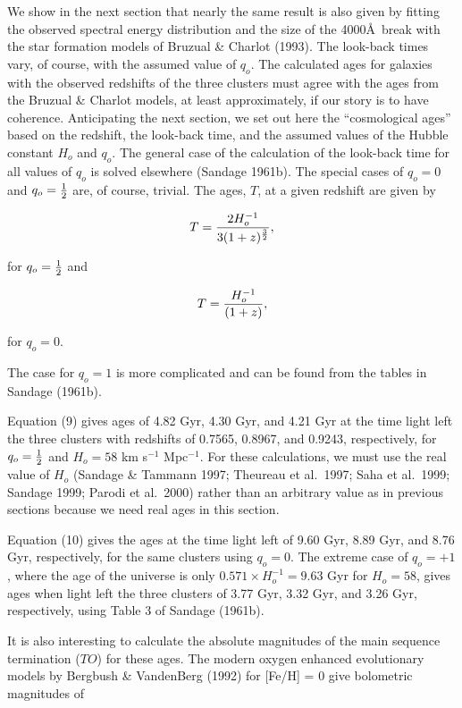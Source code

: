 \documentclass[preprint]{aastex}
\begin{document}
We show in the next section that nearly the same result is also given
by fitting the observed spectral energy distribution and the size of
the 4000\AA\ break with the star formation models of Bruzual \&
Charlot (1993).  The look-back times vary, of course, with the assumed
value of $q_o$. The calculated ages for galaxies with the observed
redshifts of the three clusters must agree with the ages from the
Bruzual \& Charlot models, at least approximately, if our story is to
have coherence. Anticipating the next section, we set out here the
``cosmological ages'' based on the redshift, the look-back time, and
the assumed values of the Hubble constant $H_o$ and $q_o$.  The
general case of the calculation of the look-back time for all values
of $q_o$ is solved elsewhere (Sandage 1961b). The special cases of
$q_o = 0$ and $q_o = {1\over{2}}$ are, of course, trivial. The ages,
$T$, at a given redshift are given by

\begin{equation}
T = {{2 H_o^{-1}}\over{3(1+z)^{3\over{2}}}},
\end{equation}

\noindent for $q_o = {1\over{2}}$ and

\begin{equation}
T = {{H_o^{-1}}\over{(1+z)}}, 
\end{equation}

\noindent for $q_o = 0$.

\noindent The case for $q_o = 1$ is more complicated and can be found
from the tables in Sandage (1961b).

Equation (9) gives ages of 4.82 Gyr, 4.30 Gyr, and 4.21 Gyr at the
time light left the three clusters with redshifts of 0.7565, 0.8967,
and 0.9243, respectively, for $q_o = {1\over{2}}$ and $H_o = 58$ km
s$^{-1}$ Mpc$^{-1}$.  For these calculations, we must use the real
value of $H_o$ (Sandage \& Tammann 1997; Theureau et al.\ 1997; Saha
et al.\ 1999; Sandage 1999; Parodi et al.\ 2000) rather than an
arbitrary value as in previous sections because we need real ages in
this section.

Equation (10) gives the ages at the time light left of 9.60 Gyr, 8.89
Gyr, and 8.76 Gyr, respectively, for the same clusters using $q_o =
0$.  The extreme case of $q_o = +1$, where the age of the universe is
only $0.571 \times H_o^{-1} = 9.63$ Gyr for $H_o = 58$, gives ages
when light left the three clusters of 3.77 Gyr, 3.32 Gyr, and 3.26
Gyr, respectively, using Table 3 of Sandage (1961b).

It is also interesting to calculate the absolute magnitudes of the
main sequence termination ($TO$) for these ages. The modern oxygen
enhanced evolutionary models by Bergbush \& VandenBerg (1992) for
[Fe/H] = 0 give bolometric magnitudes of
\end{document}
